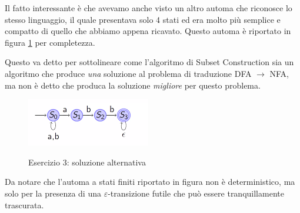 \documentclass[class=book, crop=false, oneside, 12pt]{standalone}
\begin{document}
Il fatto interessante è che avevamo anche visto un altro automa che riconosce lo stesso linguaggio, il quale presentava solo 4 stati ed era molto più semplice e compatto di quello che abbiamo appena ricavato. Questo automa è riportato in figura \ref{sol_sc_3_v2} per completezza.

Questo va detto per sottolineare come l'algoritmo di Subset Construction sia un algoritmo che produce \emph{una} soluzione al problema di traduzione DFA \(\to\) NFA, ma non è detto che produca la soluzione \emph{migliore} per questo problema.
\begin{figure}
    \centering
    \includegraphics[width=.5\textwidth,keepaspectratio]{nfa_grafo_2.png}
    \label{sol_sc_3_v2}
    \caption{Esercizio 3: soluzione alternativa}
\end{figure}
Da notare che l'automa a stati finiti riportato in figura non è deterministico, ma solo per la presenza di una \(\varepsilon\)-transizione futile che può essere tranquillamente trascurata.
\end{document}
